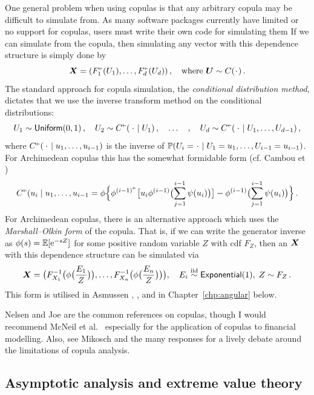 One general problem when using copulas is that any arbitrary copula may be difficult to simulate from. As many software packages currently have limited or no support for copulas, users must write their own code for simulating them
If we can simulate from the copula, then simulating any vector with this dependence structure is simply done by
\[ \bfX = (F_1^{\ginv}(U_1), \dots, F_d^{\ginv}(U_d)) \,, \quad \text{where } \bfU \sim C(\argdot)\,. \]
The standard approach for copula simulation, the \emph{conditional distribution method}, dictates that we use the inverse transform method on the conditional distributions:
\[ U_1 \sim \UnifDist(0,1)\,,\quad U_2 \sim C^{\ginv}(\,\argdot \mid U_1)\,, \quad \dots \quad, \quad U_d \sim C^{\ginv}(\,\argdot \mid U_1, \dots, U_{d-1}) \,, \]
where $C^{\ginv}(\,\argdot \mid u_1, \dots, u_{i-1})$ is the inverse of $\Prob(U_i = \argdot \mid U_1 = u_1, \dots, U_{i-1} = u_{i-1})$. For Archimedean copulas this has the somewhat formidable form (cf. Cambou et \cite{cambou2017quasi})
\[ C^{\ginv}(u_i \mid u_1, \dots, u_{i-1} = \phi\Bigl\{  \phi^{(i-1)^{\ginv}} \bigl[ u_i \phi^{(i-1)}\bigl( \sum_{j=1}^{i-1} \psi(u_i) \bigr)  \bigr] - \phi^{(i-1)}\bigl( \sum_{j=1}^{i-1} \psi(u_i) \bigr) \Bigr\} \,. \]
For Archimedean copulas, there is an alternative approach which uses the \emph{Marshall--Olkin form} of the copula. That is, if we can write the generator inverse as $\phi(s) = \operatorname{{\mathbb E}}[\mathrm{e}^{-s Z}]$ for some positive random variable $Z$ with cdf $F_Z$, then an $\bm{X}$ with this dependence structure can be simulated via
\[
\bm{X} = \bigl(F_{X_1}^{-1}\bigl( \phi\bigl(\frac{E_1}{Z}\bigr) \bigr), \dots, F_{X_n}^{-1}\bigl( \phi\bigl(\frac{E_n}{Z}\bigr) \bigr) \bigr) , \quad E_i \overset{\smash{\mathrm{iid}}}{\sim} \mathsf{Exponential}(1),\; Z \sim F_Z \,.
\]
This form is utilised in Asmussen \cite{asmussen2017conditional}, \cite{Pushout}, and in Chapter~\ref{chp:angular} below.

Nelsen \cite{nelsen2006introduction} and Joe \cite{joe1997multivariate} are the common references on copulas, though I would recommend McNeil et al.\ \cite{mcneil2015quantitative} especially for the application of copulas to financial modelling. Also, see Mikosch \cite{mikosch2006Copula} and the many responses for a lively debate around the limitations of copula analysis.

\subsection{Asymptotic analysis and extreme value theory} \label{sec:asymptotics}


